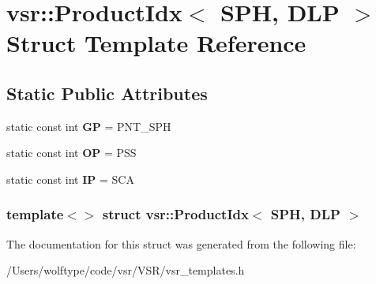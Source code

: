 \hypertarget{structvsr_1_1_product_idx_3_01_s_p_h_00_01_d_l_p_01_4}{\section{vsr\-:\-:Product\-Idx$<$ S\-P\-H, D\-L\-P $>$ Struct Template Reference}
\label{structvsr_1_1_product_idx_3_01_s_p_h_00_01_d_l_p_01_4}
}
\subsection*{Static Public Attributes}
\begin{DoxyCompactItemize}
\item 
\hypertarget{structvsr_1_1_product_idx_3_01_s_p_h_00_01_d_l_p_01_4_a99a5601f42eaad5c85a28fe8e81045ae}{static const int {\bfseries G\-P} = P\-N\-T\-\_\-\-S\-P\-H}\label{structvsr_1_1_product_idx_3_01_s_p_h_00_01_d_l_p_01_4_a99a5601f42eaad5c85a28fe8e81045ae}

\item 
\hypertarget{structvsr_1_1_product_idx_3_01_s_p_h_00_01_d_l_p_01_4_a227e22d3b4ebd050704a93d9fd8c0cf0}{static const int {\bfseries O\-P} = P\-S\-S}\label{structvsr_1_1_product_idx_3_01_s_p_h_00_01_d_l_p_01_4_a227e22d3b4ebd050704a93d9fd8c0cf0}

\item 
\hypertarget{structvsr_1_1_product_idx_3_01_s_p_h_00_01_d_l_p_01_4_a72cca8e3e90f234f3bc9dc0d434121f5}{static const int {\bfseries I\-P} = S\-C\-A}\label{structvsr_1_1_product_idx_3_01_s_p_h_00_01_d_l_p_01_4_a72cca8e3e90f234f3bc9dc0d434121f5}

\end{DoxyCompactItemize}
\subsubsection*{template$<$$>$ struct vsr\-::\-Product\-Idx$<$ S\-P\-H, D\-L\-P $>$}



The documentation for this struct was generated from the following file\-:\begin{DoxyCompactItemize}
\item 
/\-Users/wolftype/code/vsr/\-V\-S\-R/vsr\-\_\-templates.\-h\end{DoxyCompactItemize}
